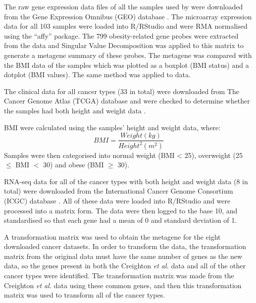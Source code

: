 \documentclass[12pt, a4paper]{article}
\begin{document}
\begin{description}[leftmargin=0pt]

\item[Validation of the methodology used.]

The raw gene expression data files of all the samples used by \citet{Creighton2012}  were downloaded from the  Gene Expression Omnibus (GEO) database .
The microarray expression data for all 103 samples were loaded into R/RStudio and were RMA normalised using the  ``affy'' package.
The 799 obesity-related  gene probes were extracted from the data and Singular Value Decomposition was applied to this matrix to generate a metagene summary of these probes.
The metagene was compared with the BMI data of the samples which was plotted as a boxplot (BMI status) and a dotplot (BMI values).
The same method was applied to \citet{Fuentes-Mattei2014} data.

\item[Identification of samples with BMI data.]

The clinical data for all cancer types (33 in total) were downloaded from The Cancer Genome Atlas (TCGA) database and were checked to determine whether the samples had both height and weight data .

\item[BMI calculation and categorisation.]

    BMI were calculated using the samples' height and weight data, where:
    \begin{equation*}
    BMI = \frac{Weight(kg)}{Height^2(m^2)}
\end{equation*}
Samples were then categorised into normal weight (BMI \textless{ }25), overweight (25 $\le$ BMI $<$ 30) and obese (BMI $\ge$ 30).

\item[Processing the cancer data.]

RNA-seq data for all of the cancer types with both height and weight data (8 in total) were downloaded from the International Cancer Genome Consortium (ICGC) database .
All of these data were loaded into R/RStudio and were processed into a matrix form.
The data were then logged to the base 10, and standardised so that each gene had a mean of 0 and standard deviation of 1.

\item[Transforming the cancer data.]

A transformation matrix was used to obtain the metagene for the eight downloaded cancer datasets.
In order to transform the data, the transformation matrix from the original data must have the same number of genes as the new data, so the genes present in both the Creighton \textit{et al.} data and all of the other cancer types were identified.
The transformation matrix was made from the Creighton \textit{et al.} data using these common genes, and then this transformation matrix was used to transform all of the cancer types.


\end{description}
\end{document}
